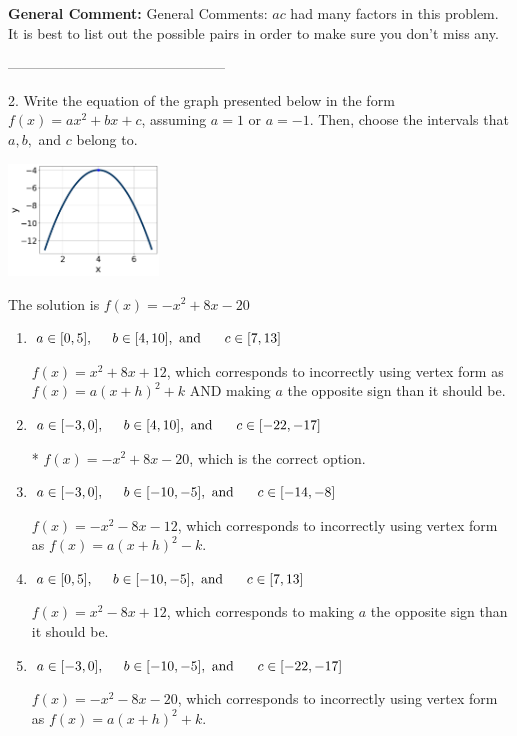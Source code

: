 \documentclass{extbook}[14pt]
\begin{document}
\textbf{General Comment:} General Comments: $ac$ had many factors in this problem. It is best to list out the possible pairs in order to make sure you don't miss any. 

-----------------------------------------------

2. Write the equation of the graph presented below in the form $f(x)=ax^2+bx+c$, assuming  $a=1$ or $a=-1$. Then, choose the intervals that $a, b,$ and $c$ belong to.
\begin{center} \includegraphics[width=0.3\textwidth]{../Figures/quadraticGraphToEquationA.png} \end{center} 

The solution is $ f(x) = -x^{2} +8 x -20 $ 

\begin{enumerate}[label=\Alph*.] 
\item $ a \in [0, 5], \hspace*{5mm} b \in [4, 10], \text{ and } \hspace*{5mm} c \in [7, 13] $ 

 $f(x)=x^{2} +8 x + 12$, which corresponds to incorrectly using vertex form as $f(x) = a(x+h)^2+k$ AND making $a$ the opposite sign than it should be. 
\item $ a \in [-3, 0], \hspace*{5mm} b \in [4, 10], \text{ and } \hspace*{5mm} c \in [-22, -17] $ 

 * $f(x)=-x^{2} +8 x -20$, which is the correct option. 
\item $ a \in [-3, 0], \hspace*{5mm} b \in [-10, -5], \text{ and } \hspace*{5mm} c \in [-14, -8] $ 

 $f(x)=-x^{2} -8 x -12$, which corresponds to incorrectly using vertex form as $f(x) = a(x+h)^2 - k$. 
\item $ a \in [0, 5], \hspace*{5mm} b \in [-10, -5], \text{ and } \hspace*{5mm} c \in [7, 13] $ 

 $f(x)=x^{2} -8 x + 12$, which corresponds to making $a$ the opposite sign than it should be. 
\item $ a \in [-3, 0], \hspace*{5mm} b \in [-10, -5], \text{ and } \hspace*{5mm} c \in [-22, -17] $ 

 $f(x)=-x^{2} -8 x -20$, which corresponds to incorrectly using vertex form as $f(x) = a(x+h)^2+k$. 
\end{enumerate} 
 
\end{document}
